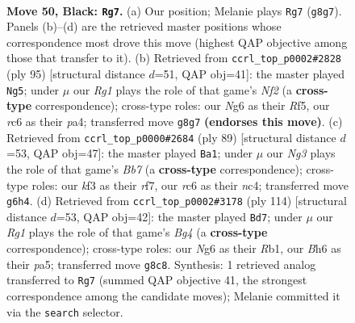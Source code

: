 \documentclass[11pt]{article}
\begin{document}
\clearpage

\begin{figure}[p]\centering
\begin{subfigure}{0.46\textwidth}\centering
\resizebox{\linewidth}{!}{%
\newchessgame
\chessboard[
  setfen={k5r1/p1B5/PpR3nb/1B3p2/5P2/4pK2/8/8 b - - 5 50},
  showmover=false,
  pgfstyle=straightmove, color=movearrow, markmove={g8-g7}
]}
\caption{}
\end{subfigure}\hfill
\begin{subfigure}{0.46\textwidth}\centering
\resizebox{\linewidth}{!}{%
\newchessgame
\chessboard[
  setfen={2k5/5n2/p1b1p3/1p3r2/P1p5/2B2P2/4B1P1/3R2K1 b - - 5 48},
  showmover=false,
  pgfstyle=straightmove, color=movearrow, markmove={f7-g5}
]}
\caption{}
\end{subfigure}
\\[4pt]
\begin{subfigure}{0.46\textwidth}\centering
\resizebox{\linewidth}{!}{%
\newchessgame
\chessboard[
  setfen={1k6/1p3Rp1/8/2pB2K1/p1N5/Pr6/1b3P2/8 b - - 0 45},
  showmover=false,
  pgfstyle=straightmove, color=movearrow, markmove={b2-a1}
]}
\caption{}
\end{subfigure}\hfill
\begin{subfigure}{0.46\textwidth}\centering
\resizebox{\linewidth}{!}{%
\newchessgame
\chessboard[
  setfen={8/8/1p6/p1bPk1p1/P5B1/2r1P3/4KP2/1R6 w - - 7 58},
  showmover=false,
  pgfstyle=straightmove, color=movearrow, markmove={g4-d7}
]}
\caption{}
\end{subfigure}
\caption{\textbf{Move 50, Black: \texttt{Rg7}.} (a) Our position; Melanie plays \texttt{Rg7} (\texttt{g8g7}). Panels (b)--(d) are the retrieved master positions whose correspondence most drove this move (highest QAP objective among those that transfer to it). (b) Retrieved from \texttt{ccrl\_top\_p0002\#2828} (ply 95) [structural distance $d$=51, QAP obj=41]: the master played \texttt{Ng5}; under $\mu$ our \emph{Rg1} plays the role of that game's \emph{Nf2} (a \textbf{cross-type} correspondence); cross-type roles: our \emph{N}g6 as their \emph{R}f5, our \emph{r}c6 as their \emph{p}a4; transferred move \texttt{g8g7} \textbf{(endorses this move)}. (c) Retrieved from \texttt{ccrl\_top\_p0000\#2684} (ply 89) [structural distance $d$=53, QAP obj=47]: the master played \texttt{Ba1}; under $\mu$ our \emph{Ng3} plays the role of that game's \emph{Bb7} (a \textbf{cross-type} correspondence); cross-type roles: our \emph{k}f3 as their \emph{r}f7, our \emph{r}c6 as their \emph{n}c4; transferred move \texttt{g6h4}. (d) Retrieved from \texttt{ccrl\_top\_p0002\#3178} (ply 114) [structural distance $d$=53, QAP obj=42]: the master played \texttt{Bd7}; under $\mu$ our \emph{Rg1} plays the role of that game's \emph{Bg4} (a \textbf{cross-type} correspondence); cross-type roles: our \emph{N}g6 as their \emph{R}b1, our \emph{B}h6 as their \emph{p}a5; transferred move \texttt{g8c8}. Synthesis: 1 retrieved analog transferred to \texttt{Rg7} (summed QAP objective 41, the strongest correspondence among the candidate moves); Melanie committed it via the \texttt{search} selector.}
\label{fig:thought-m99}
\end{figure}
\end{document}
